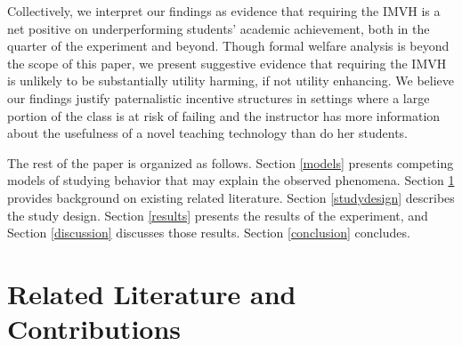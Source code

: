 \documentclass[12pt]{article}
\begin{document}
Collectively, we interpret our findings as evidence that requiring the IMVH is a net positive on underperforming students' academic achievement, both in the quarter of the experiment and beyond. Though formal welfare analysis is beyond the scope of this paper, we present suggestive evidence that requiring the IMVH is unlikely to be substantially utility harming, if not utility enhancing. We believe our findings justify paternalistic incentive structures in settings where a large portion of the class is at risk of failing and the instructor has more information about the usefulness of a novel teaching technology than do her students.


The rest of the paper is organized as follows. Section \ref{models} presents competing models of studying behavior that may explain the observed phenomena. Section \ref{background} provides background on existing related literature. Section \ref{studydesign} describes the study design. Section \ref{results} presents the results of the experiment, and Section \ref{discussion} discusses those results. Section \ref{conclusion} concludes.


\section{Related Literature and Contributions} \label{background}
\end{document}
